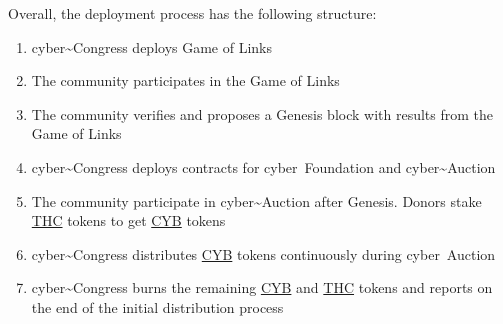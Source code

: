 \documentclass[8pt,oneside]{amsart}
\begin{document}
Overall, the deployment process has the following structure:

\begin{enumerate}
 \item cyber\~{}Congress deploys Game of Links
 \item The community participates in the Game of Links
 \item The community verifies and proposes a Genesis block with results from the Game of Links
 \item cyber\~{}Congress deploys contracts for cyber~Foundation and cyber\~{}Auction
 \item The community participate in cyber\~{}Auction after Genesis. Donors stake {\hyperref[thc]{THC}} tokens to get {\hyperref[cyb]{CYB}} tokens
 \item cyber\~{}Congress distributes {\hyperref[cyb]{CYB}} tokens continuously during cyber~Auction
 \item cyber\~{}Congress burns the remaining {\hyperref[cyb]{CYB}} and {\hyperref[thc]{THC}} tokens and reports on the end of the initial distribution process
\end{enumerate}
\end{document}
